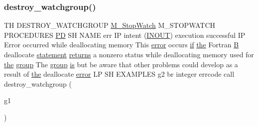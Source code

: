 \subsubsection{\texorpdfstring{destroy\+\_\+watchgroup()}{destroy\_watchgroup()}\hspace{0.1cm}{\footnotesize\ttfamily [2/2]}}
{\footnotesize\ttfamily TH D\+E\+S\+T\+R\+O\+Y\+\_\+\+W\+A\+T\+C\+H\+G\+R\+O\+UP \hyperlink{option__stopwatch_83_8txt_aa2011fc45a5e502e87ee50996a8a9305}{M\+\_\+\+Stop\+Watch} M\+\_\+\+S\+T\+O\+P\+W\+A\+T\+CH P\+R\+O\+C\+E\+D\+U\+R\+ES \hyperlink{what__overview_81_8txt_a85f26da5a4481fbdb0d9c79f2b94de3e}{PD} SH N\+A\+ME err IP intent (\hyperlink{M__stopwatch_83_8txt_aac11c70dd588f9c3fe71e95dbe89902f}{I\+N\+O\+UT}) execution successful IP Error occurred while deallocating memory This \hyperlink{M__stopwatch_83_8txt_ac4611edff506351be87ddb9adfc62315}{error} occurs \hyperlink{exit_87_8txt_a77395982f8d25581c808c40f3b634d90}{if} \hyperlink{M__stopwatch_83_8txt_a0f266597de2e57eb3aa964927bb30e14}{the} Fortran \hyperlink{intro__blas1_83_8txt_a5f157716d3fd55e7b7e08312dc859b58}{B} deallocate \hyperlink{M__stopwatch_83_8txt_a43758526aa61bbaa49faf1e287658350}{statement} \hyperlink{M__stopwatch_83_8txt_aee54cdd5349bf498aa96e7f9426a0717}{returns} a nonzero status while deallocating memory used for \hyperlink{M__stopwatch_83_8txt_a0f266597de2e57eb3aa964927bb30e14}{the} \hyperlink{M__stopwatch_83_8txt_a80fa32a76a22835e3c85462b2803875c}{group} The \hyperlink{M__stopwatch_83_8txt_a80fa32a76a22835e3c85462b2803875c}{group} \hyperlink{intro__blas1_83_8txt_a42a91df93f840595de3019ceb5d1df23}{is} but be aware that other problems could develop as a result of \hyperlink{M__stopwatch_83_8txt_a0f266597de2e57eb3aa964927bb30e14}{the} deallocate \hyperlink{M__stopwatch_83_8txt_ac4611edff506351be87ddb9adfc62315}{error} LP SH E\+X\+A\+M\+P\+L\+ES g2 br integer errcode call destroy\+\_\+watchgroup (\begin{DoxyParamCaption}\item[{g1}]{ }\end{DoxyParamCaption})}

\mbox{\label{destroy__watchgroup_83_8txt_afebe2ecc33b5b50e6b6382da3deb8387}} 
